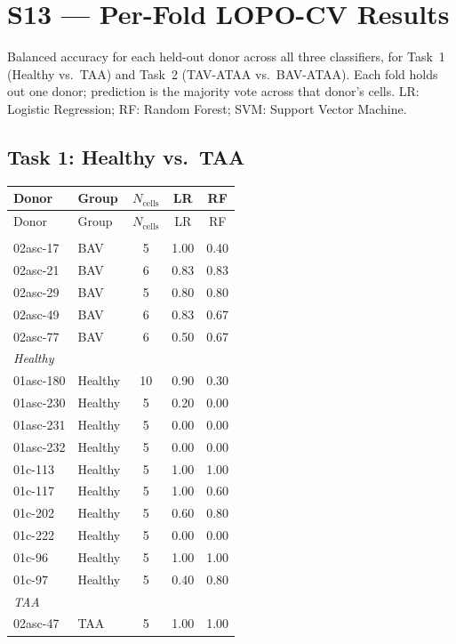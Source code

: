 \documentclass[11pt,a4paper]{article}
\begin{document}
\section*{S13 — Per-Fold LOPO-CV Results}
Balanced accuracy for each held-out donor across all three classifiers,
for Task~1 (Healthy vs.\ TAA) and Task~2 (TAV-ATAA vs.\ BAV-ATAA).
Each fold holds out one donor; prediction is the majority vote across
that donor's cells. LR: Logistic Regression; RF: Random Forest; SVM: Support Vector Machine.
\vspace{1em}
\subsection*{Task 1: Healthy vs.\ TAA}
\begin{longtable}{llccc}
\toprule
Donor & Group & $N_\text{cells}$ & LR & RF \\
\midrule\endfirsthead
\toprule Donor & Group & $N_\text{cells}$ & LR & RF \\\midrule\endhead
\bottomrule\endfoot
\multicolumn{5}{l}{\textit{BAV}} \\
  02asc-17 & BAV & 5 & 1.00 & 0.40 \\
  02asc-21 & BAV & 6 & 0.83 & 0.83 \\
  02asc-29 & BAV & 5 & 0.80 & 0.80 \\
  02asc-49 & BAV & 6 & 0.83 & 0.67 \\
  02asc-77 & BAV & 6 & 0.50 & 0.67 \\
\midrule
\multicolumn{5}{l}{\textit{Healthy}} \\
  01asc-180 & Healthy & 10 & 0.90 & 0.30 \\
  01asc-230 & Healthy & 5 & 0.20 & 0.00 \\
  01asc-231 & Healthy & 5 & 0.00 & 0.00 \\
  01asc-232 & Healthy & 5 & 0.00 & 0.00 \\
  01c-113 & Healthy & 5 & 1.00 & 1.00 \\
  01c-117 & Healthy & 5 & 1.00 & 0.60 \\
  01c-202 & Healthy & 5 & 0.60 & 0.80 \\
  01c-222 & Healthy & 5 & 0.00 & 0.00 \\
  01c-96 & Healthy & 5 & 1.00 & 1.00 \\
  01c-97 & Healthy & 5 & 0.40 & 0.80 \\
\midrule
\multicolumn{5}{l}{\textit{TAA}} \\
  02asc-47 & TAA & 5 & 1.00 & 1.00 \\

\end{longtable}
\end{document}
